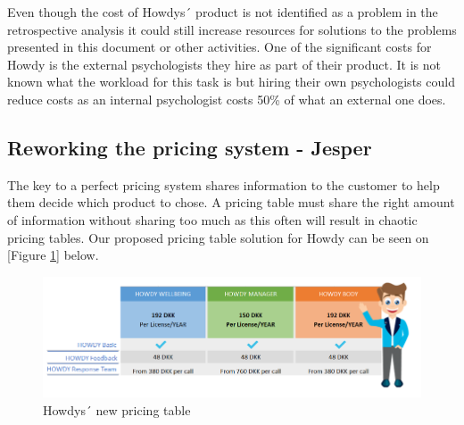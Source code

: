 \noindent Even though the cost of Howdys´ product is not identified as a problem in the retrospective analysis it could still increase resources for solutions to the problems presented in this document or other activities. One of the significant costs for Howdy is the external psychologists they hire as part of their product. It is not known what the workload for this task is but hiring their own psychologists could reduce costs as an internal psychologist costs 50\% of what an external one does.

\subsection{Reworking the pricing system - Jesper}
The key to a perfect pricing system shares information to the customer to help them decide which product to chose. A pricing table must share the right amount of information without sharing too much as this often will result in chaotic pricing tables. Our proposed pricing table solution for Howdy can be seen on [Figure \ref{pricingtable}] below.

\begin{figure}[H]
\centering
\includegraphics[scale=0.72]{figures/pricing_Howdy.png}
\caption{Howdys´ new pricing table}
\label{pricingtable}
\end{figure}

